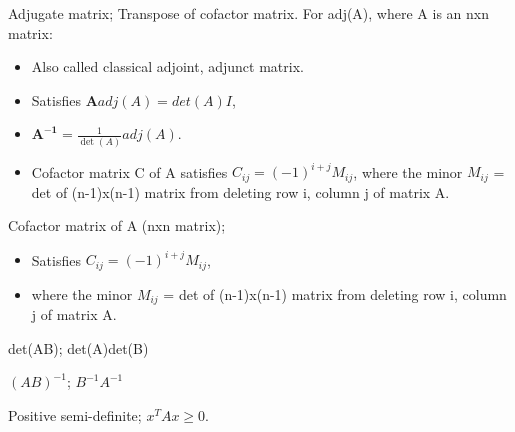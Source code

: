 


Adjugate matrix; Transpose of cofactor matrix. For adj(A), where A is an nxn matrix: \begin{itemize} \item Also called classical adjoint, adjunct matrix.  \item Satisfies $\mathbf{A}adj(A)=det(A)I$, \item $\mathbf{A^{-1}}=\frac{1}{\det(A)}adj(A)$.  \item Cofactor matrix C of A satisfies $C_{ij}=(-1)^{i+j}M_{ij}$, where the minor $M_{ij}$ = det of (n-1)x(n-1) matrix from deleting row i, column j of matrix A.  \end{itemize}

Cofactor matrix of A (nxn matrix); \begin{itemize} \item Satisfies $C_{ij}=(-1)^{i+j}M_{ij}$, \item where the minor $M_{ij}$ = det of (n-1)x(n-1) matrix from deleting row i, column j of matrix A.  \end{itemize}

det(AB); det(A)det(B)

$(AB)^{-1}$; $B^{-1}A^{-1}$

Positive semi-definite; $x^TAx\geq 0$.


